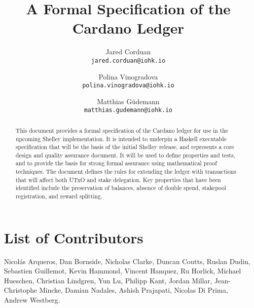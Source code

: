 \title{A Formal Specification of the Cardano Ledger}

\author{Jared Corduan  \\ {\small \texttt{jared.corduan@iohk.io}} \\
   \and Polina Vinogradova \\ {\small \texttt{polina.vinogradova@iohk.io}} \\
   \and Matthias G\"udemann  \\ {\small \texttt{matthias.gudemann@iohk.io}}}


\maketitle

\begin{abstract}
This document provides a formal specification of the Cardano ledger for use in the upcoming Shelley implementation.
It is intended to underpin a Haskell executable specification that will be the basis of the initial
Shelley release, and represents a core design and quality assurance document.
It will be used to define properties and tests, and to provide the basis for strong formal assurance
using mathematical proof techniques.
The document defines the rules for extending the ledger with transactions
that will affect both UTxO and stake delegation.
Key properties that have been identified include the preservation of balances, absence of double spend, stakepool registration,
and reward splitting.
\end{abstract}

\section*{List of Contributors}
\label{acknowledgements}

Nicol\'as Arqueros,
Dan Bornside,
Nicholas Clarke,
Duncan Coutts,
Ruslan Dudin,
Sebastien Guillemot,
Kevin Hammond,
Vincent Hanquez,
Ru Horlick,
Michael Hueschen,
Christian Lindgren,
Yun Lu,
Philipp Kant,
Jordan Millar,
Jean-Christophe Mincke,
Damian Nadales,
Ashish Prajapati,
Nicolas Di Prima,
Andrew Westberg.
